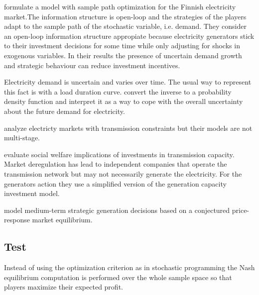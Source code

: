 \cite{Chuang2001}

\cite{Ventosa2002}

\cite{Hogendorn2003}

\cite{Chaton2003}

\cite{Pineau2003} formulate a model with sample path optimization for the Finnish electricity market.The information structure is open-loop and the strategies of the players adapt to the sample path of the stochastic variable, i.e. demand. They consider an open-loop information structure appropiate because electricity generators stick to their investment decisions for some time while only adjusting for shocks in exogenous variables. In their results the presence of uncertain demand growth and strategic behaviour can reduce investment incentives.

\cite{Murphy2005}

Electricity demand is uncertain and varies over time. The usual way to represent this fact is with a load duration curve. \cite{Murphy2005} convert the inverse to a probability density function and interpret it as a way to cope with the overall uncertainty about the future demand for electricity.

\cite{Neuhoff2005} analyze electricty markets with transmission constraints but their models are not multi-stage.

\cite{Sauma2006} evaluate social welfare implications of investments in transmission capacity. Market deregulation has lead to independent companies that operate the transmission network but may not necessarily generate the electricity. For the generators action they use a simplified version of the \cite{Murphy2005} generation capacity investment model.

\cite{Barmack2007}

\cite{Centeno2007} model medium-term strategic generation decisions based on a conjectured price-response market equilibrium.

\cite{Genc2007}

\cite{Kiesling2007}

 






\subsection{Test}
\label{sec:test}

Instead of using the optimization criterion as in stochastic programming the Nash equilibrium computation is performed over the whole sample space so that players maximize their expected profit.

